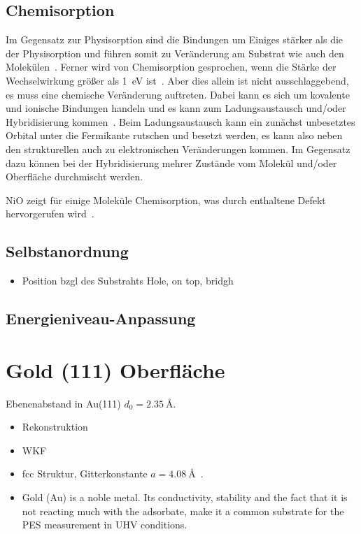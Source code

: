         \subsection{Chemisorption}
            Im Gegensatz zur Physisorption sind die Bindungen um Einiges stärker als die der Physisorption und führen somit zu Veränderung am Substrat wie auch den Molekülen~\cite{bergenti_spinterface_2019}.
            Ferner wird von Chemisorption gesprochen, wenn die Stärke der Wechselwirkung größer als \SI{1}{\electronvolt} ist~\cite{muscat_chemisorption_1978}.
            Aber dies allein ist nicht ausschlaggebend, es muss eine chemische Veränderung auftreten.
            Dabei kann es sich um kovalente und ionische Bindungen handeln und es kann zum Ladungsaustausch und/oder Hybridisierung kommen~\cite{harutyunyan_hybridisation_2013}.
            Beim Ladungsaustausch kann ein zunächst unbesetztes Orbital unter die Fermikante rutschen und besetzt werden, es kann also neben den strukturellen auch zu elektronischen Veränderungen kommen.
            Im Gegensatz dazu können bei der Hybridisierung mehrer Zustände vom Molekül und/oder Oberfläche durchmischt werden.

            NiO zeigt für einige Moleküle Chemisorption, was durch enthaltene Defekt hervorgerufen wird~\cite{kunz_chemisorption_1985}.
        
        \subsection{Selbstanordnung}
        \begin{itemize}
            \item Position bzgl des Substrahts Hole, on top, bridgh
        \end{itemize}

        \subsection{Energieniveau-Anpassung}


    \section{Gold (111) Oberfläche}
        \textbf{\cite{5A_1}}
        Ebenenabstand in Au(111) $d_0 = \SI{2.35}{\angstrom}$.

        \begin{itemize}
            \item Rekonstruktion
            \item WKF
            \item fcc Struktur, Gitterkonstante  $a=\SI{4.08}{\angstrom}$~\cite{Marx}.
            \item Gold (Au) is a noble metal. Its conductivity, stability and the fact that it is not reacting much with the adsorbate, make it a common substrate for the PES measurement in UHV conditions.
        \end{itemize}


